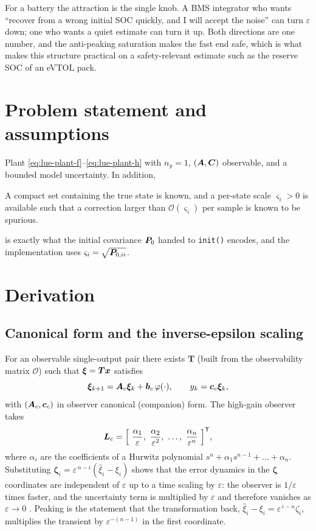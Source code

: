 For a battery the attraction is the single knob.  A BMS integrator who wants ``recover from a
wrong initial SOC quickly, and I will accept the noise'' can turn $\varepsilon$ down; one who
wants a quiet estimate can turn it up.  Both directions are one number, and the anti-peaking
saturation makes the fast end safe, which is what makes this structure practical on a
safety-relevant estimate such as the reserve SOC of an eVTOL pack.

\section{Problem statement and assumptions}
Plant \eqref{eq:lue-plant-f}--\eqref{eq:lue-plant-h} with $n_y = 1$, $(\bm{A},\bm{C})$ observable, and
a bounded model uncertainty.  In addition,
\begin{assumption}\label{as:hgo-compact}
A compact set containing the true state is known, and a per-state scale
$\varsigma_i>0$ is available such that a correction larger than $\mathcal{O}(\varsigma_i)$ per
sample is known to be spurious.
\end{assumption}
 is exactly what the initial covariance $\bm{P}_0$ handed to \texttt{init()}
encodes, and the implementation uses $\varsigma_i = \sqrt{\bm{P}_{0,ii}}$.

\section{Derivation}

\subsection{Canonical form and the inverse-epsilon scaling}
For an observable single-output pair there exists $\bm{T}$ (built from the observability matrix
$\mathcal{O}$) such that $\bm{\xi} = \bm{T}\bm{x}$ satisfies
\begin{equation}
\bm{\xi}_{k+1} = \bm{A}_c\bm{\xi}_k + \bm{b}_c\,\varphi(\cdot) , \qquad y_k = \bm{c}_c\bm{\xi}_k ,
\label{eq:hgo-canon}
\end{equation}
with $(\bm{A}_c,\bm{c}_c)$ in observer canonical (companion) form.  The high-gain observer takes
\begin{equation}
\mL_c = \Big[\ \frac{\alpha_1}{\varepsilon},\ \frac{\alpha_2}{\varepsilon^2},\ \dots,\
\frac{\alpha_n}{\varepsilon^{n}}\ \Big]^\T ,
\label{eq:hgo-gain}
\end{equation}
where $\alpha_i$ are the coefficients of a Hurwitz polynomial
$s^n + \alpha_1 s^{n-1} + \dots + \alpha_n$.  Substituting $\bm{\zeta}_i = \varepsilon^{\,n-i}
(\hat{\xi}_i-\xi_i)$ shows that the error dynamics in the $\bm{\zeta}$ coordinates are
independent of $\varepsilon$ up to a time scaling by $\varepsilon$: the observer is $1/\varepsilon$
times faster, and the uncertainty term is multiplied by $\varepsilon$ and therefore vanishes as
$\varepsilon\to0$ \cite[Sec.~14.5]{khalil2002}.  Peaking is the statement that the transformation
back, $\hat{\xi}_i - \xi_i = \varepsilon^{\,i-n}\zeta_i$, multiplies the transient by
$\varepsilon^{-(n-1)}$ in the first coordinate.

